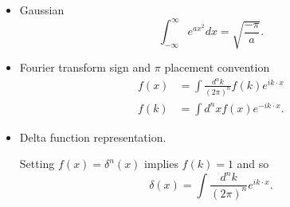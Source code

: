 %
%

\begin{itemize}
\item Gaussian
\begin{dmath}\label{eqn:usefulFormulas:20}
\int_{-\infty}^\infty e^{a x^2} dx = \sqrt{\frac{-\pi}{a}}.
\end{dmath}
\item Fourier transform sign and \( \pi \) placement convention
\begin{dmath}\label{eqn:usefulFormulas:40}
\begin{aligned}
f(x) &= \int \frac{d^n k}{(2 \pi)^n} f(k) e^{i k \cdot x} \\
f(k) &= \int d^n x f(x) e^{-i k \cdot x}.
\end{aligned}
\end{dmath}
\item Delta function representation.

Setting \( f(x) = \delta^n(x) \) implies \( f(k) = 1 \) and so
\begin{dmath}\label{eqn:usefulFormulas:60}
\delta(x) = \int \frac{d^n k}{(2 \pi)^n} e^{i k \cdot x}.
\end{dmath}


\end{itemize}
